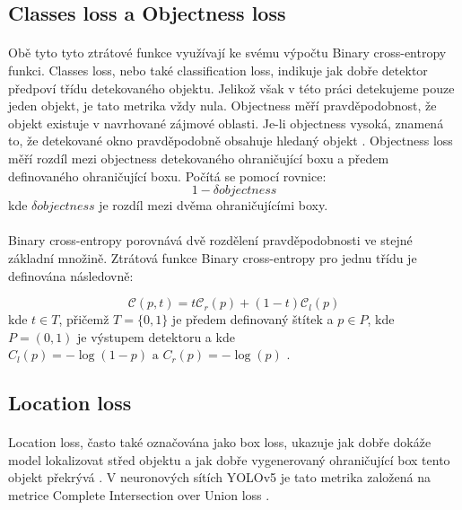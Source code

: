 \subsection*{Classes loss a Objectness loss}
\label{cls_obj_loss}
\paragraph{} Obě tyto tyto ztrátové funkce využívají ke svému výpočtu Binary cross-entropy funkci. Classes loss, nebo také classification loss, indikuje jak dobře detektor předpoví třídu detekovaného objektu. Jelikož však v této práci detekujeme pouze jeden objekt, je tato metrika vždy nula. Objectness měří pravděpodobnost, že objekt existuje v navrhované zájmové oblasti. Je-li objectness vysoká, znamená to, že detekované okno pravděpodobně obsahuje hledaný objekt \cite{loss}. Objectness loss měří rozdíl mezi objectness detekovaného ohraničující boxu a předem definovaného ohraničující boxu. Počítá se pomocí rovnice:
\begin{equation}
    1 - \delta\textit{objectness}
\end{equation}
kde \begin{math}\delta\textit{objectness}\end{math} je rozdíl mezi dvěma ohraničujícími boxy.
\paragraph{} Binary cross-entropy porovnává dvě rozdělení pravděpodobnosti ve stejné základní množině. Ztrátová funkce Binary cross-entropy pro jednu třídu je definována následovně:

 \begin{equation}
\mathcal{C}(p, t)=t \mathcal{C}_r(p)+(1-t) \mathcal{C}_l(p)
\end{equation}
kde $t \in T$, přičemž $T=\{0,1\}$ je předem definovaný štítek a $p \in P$, kde $P=(0,1)$ je výstupem detektoru a kde \begin{math}C_l(p)=-\log (1-p) \text { a }C_r(p)=-\log (p)\end{math} \cite{bce}.

\subsection*{Location loss}
\label{location_loss}
\paragraph{} Location loss, často také označována jako box loss, ukazuje jak dobře dokáže model lokalizovat střed objektu a jak dobře vygenerovaný ohraničující box tento objekt překrývá \cite{loss}. V neuronových sítích YOLOv5 je tato metrika založená na metrice Complete Intersection over Union loss \cite{ultralytics}.
